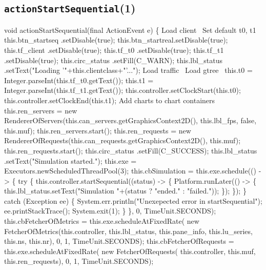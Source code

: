 \subsection{\texttt{actionStartSequential}(1)}
\nwenddocs{}\endmoddef{}
void actionStartSequential(final ActionEvent e) \{
  \LA{}Load client~{\nwtagstyle{}}\RA{}
  \LA{}Set default t0, t1~{\nwtagstyle{}}\RA{}
  this.btn_startseq .setDisable(true);
  this.btn_startreal.setDisable(true);
  this.tf_client     .setDisable(true);
  this.tf_t0        .setDisable(true);
  this.tf_t1        .setDisable(true);
  this.circ_status  .setFill(C_WARN);
  this.lbl_status   .setText("Loading '"+this.clientclass+"'...");
  \LA{}Load traffic~{\nwtagstyle{}}\RA{}
  \LA{}Load gtree~{\nwtagstyle{}}\RA{}
  this.t0 = Integer.parseInt(this.tf_t0.getText());
  this.t1 = Integer.parseInt(this.tf_t1.getText());
  this.controller.setClockStart(this.t0);
  this.controller.setClockEnd(this.t1);
  \LA{}Add charts to chart containers~{\nwtagstyle{}}\RA{}
  this.ren_servers = new RendererOfServers(this.can_servers.getGraphicsContext2D(), this.lbl_fps, false, this.muf);
  this.ren_servers.start();
  this.ren_requests = new RendererOfRequests(this.can_requests.getGraphicsContext2D(), this.muf);
  this.ren_requests.start();
  this.circ_status  .setFill(C_SUCCESS);
  this.lbl_status   .setText("Simulation started.");
  this.exe = Executors.newScheduledThreadPool(3);
  this.cbSimulation = this.exe.schedule(() -> \{
    try \{
      this.controller.startSequential((status) -> \{
        Platform.runLater(() -> \{
          this.lbl_status.setText("Simulation "+(status ? "ended." : "failed."));
        \});
      \});
    \} catch (Exception ee) \{
      System.err.println("Unexepected error in startSequential");
      ee.printStackTrace();
      System.exit(1);
    \}
  \}, 0, TimeUnit.SECONDS);
  this.cbFetcherOfMetrics = this.exe.scheduleAtFixedRate(
      new FetcherOfMetrics(this.controller, this.lbl_status, this.pane_info, this.lu_series, this.ns, this.nr), 0, 1, TimeUnit.SECONDS);
  this.cbFetcherOfRequests = this.exe.scheduleAtFixedRate(
      new FetcherOfRequests(
        this.controller, this.muf, this.ren_requests), 0, 1, TimeUnit.SECONDS);
